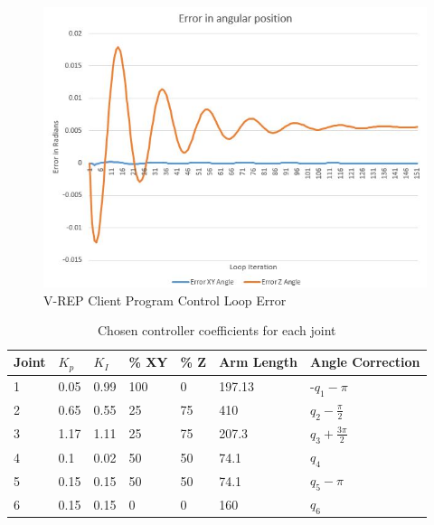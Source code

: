 \documentclass[12pt,openany,a4paper]{book}
\begin{document}
\begin{center}
\begin{figure}[htb]
  \includegraphics[width=1\linewidth]{control_loop_error.jpg}
\caption{V-REP Client Program Control Loop Error}
\end{figure}
\end{center}

\begin{center}
\begin{table}[htb]

\begin{tabular}{| p{1.2cm} | p{2cm} | p{2cm} | p{2cm} | p{2cm} | p{2cm} | p{2cm} |}
    \hline
    Joint & $K_p$ & $K_I$ & \% XY & \% Z & Arm Length & Angle Correction \\ \hline
     1 & 0.05	& 0.99	& 100	& 0		& 197.13 &	-$q_1 - \pi$ \\ \hline
     2 & 0.65	& 0.55	& 25	& 75	& 410 	&	$q_2 - \frac{\pi}{2}$  \\ \hline
     3 & 1.17	& 1.11	& 25	& 75	& 207.3 &	$q_3 + \frac{3 \pi}{2}$ \\ \hline
     4 & 0.1	& 0.02	& 50	& 50	& 74.1	& $q_4$ \\ \hline
     5 & 0.15	& 0.15	& 50	& 50 	& 74.1	& $q_5 - \pi$ \\ \hline
     6 & 0.15	& 0.15	& 0		& 0 	& 160 	& $q_6$ \\ \hline
    \end{tabular}
    \caption{Chosen controller coefficients for each joint}
\end{table}
\end{center}
\end{document}
